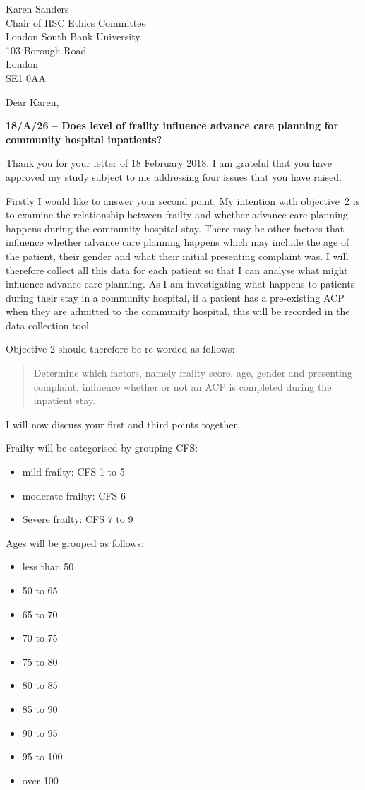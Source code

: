 \documentclass
[
	12pt,
	a4paper,
	oneside
]{letter}
\begin{document}
\begin{letter}{Karen Sanders\\
		Chair of HSC Ethics Committee\\
		London South Bank University\\
		103 Borough Road\\
		London\\
		SE1 0AA}

\opening{Dear Karen,}

\bigskip
\textbf{18/A/26 -- Does level of frailty influence advance care planning 
	for community hospital inpatients? }
\bigskip

Thank you for your letter of 18 February 2018. I am grateful that you have 
approved my study subject to me addressing four issues that you have raised.

Firstly I would like to answer your second point. My intention with objective~2
is to examine the relationship between frailty and whether advance care
planning happens during the community hospital stay. There may be other factors 
that influence whether advance care
planning happens which may include the age of the patient, their gender and what 
their initial presenting complaint was. I will therefore collect all this data for
each patient so that I can analyse what might influence advance care planning. As
I am investigating what happens to patients during their stay in a community
hospital, if a patient has a pre-existing ACP when they are admitted to the 
community hospital, this will be recorded in the data collection tool.

Objective 2 should therefore be re-worded as follows:
	\begin{quote}
		Determine which factors, namely frailty score, age, gender and
		presenting complaint, influence whether or not an ACP is 
		completed during the inpatient stay.
	\end{quote}

I will now discuss your first and third points together.

Frailty will be categorised by grouping CFS:
	\begin{itemize}
		\item mild frailty: CFS 1 to 5
		\item moderate frailty: CFS 6
		\item Severe frailty: CFS 7 to 9
	\end{itemize}

Ages will be grouped as follows:
	\begin{itemize}
		\item less than 50
		\item 50 to 65
		\item 65 to 70
		\item 70 to 75
 		\item 75 to 80
		\item 80 to 85
 		\item 85 to 90
 		\item 90 to 95
 		\item 95 to 100
 		\item over 100
	\end{itemize}


\end{letter}
\end{document}

